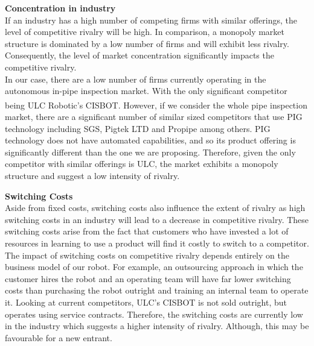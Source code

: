 \documentclass[11pt]{article}		%
\newcommand{\supercite}[1]{\textsuperscript{\cite{#1}}}		%
\begin{document}
		        \textbf{Concentration in industry}\\
		        If an industry has a high number of competing firms with similar offerings, the level of competitive rivalry will be high. In comparison, a monopoly market structure is dominated by a low number of firms and will exhibit less rivalry. Consequently, the level of market concentration significantly impacts the competitive rivalry.\\
		        \hspace*{3ex}In our case, there are a low number of firms currently operating in the autonomous in-pipe inspection market. With the only significant competitor being ULC Robotic’s CISBOT\supercite{cisbotbeast}. However, if we consider the whole pipe inspection market, there are a significant number of similar sized competitors that use PIG technology including SGS, Pigtek LTD and Propipe among others. PIG technology does not have automated capabilities, and so its product offering is significantly different than the one we are proposing. Therefore, given the only competitor with similar offerings is ULC, the market exhibits a monopoly structure and suggest a low intensity of rivalry.
		        
		        \textbf{Switching Costs}\\
		        Aside from fixed costs, switching costs also influence the extent of rivalry as high switching costs in an industry will lead to a decrease in competitive rivalry. These switching costs arise from the fact that customers who have invested a lot of resources in learning to use a product will find it costly to switch to a competitor. \\
		        \hspace*{3ex}The impact of switching costs on competitive rivalry depends entirely on the business model of our robot. For example, an outsourcing approach in which the customer hires the robot and an operating team will have far lower switching costs than purchasing the robot outright and training an internal team to operate it. Looking at current competitors, ULC’s CISBOT is not sold outright, but operates using service contracts. Therefore, the switching costs are currently low in the industry which suggests a higher intensity of rivalry. Although, this may be favourable for a new entrant. 
		
\end{document}
